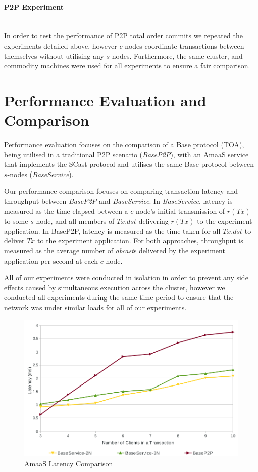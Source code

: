 \paragraph{P2P Experiment} \hspace{0pt} \\
In order to test the performance of P2P total order commits we repeated the  experiments detailed above, however $c$-nodes coordinate transactions between themselves without utilising any $s$-nodes.  Furthermore, the same cluster, and commodity machines were used for all experiments to ensure a fair comparison.   

\section{Performance Evaluation and Comparison}\label{sec:AmaaS_results}
Performance evaluation focuses on the comparison of a \textsf{Base} protocol (TOA), being utilised in a traditional P2P scenario (\emph{BaseP2P}), with an \textsf{AmaaS} service that implements the \textsf{SCast} protocol and utilises the same \textsf{Base} protocol between $s$-nodes (\emph{BaseService}).

Our performance comparison focuses on comparing transaction latency and throughput between \emph{BaseP2P} and \emph{BaseService}.  In \emph{BaseService}, latency is measured as the time elapsed between a $c$-node's initial transmission of $r(Tx)$ to some $s$-node, and all members of $Tx.dst$ delivering $r(Tx)$ to the experiment application. In BaseP2P, latency is measured as the time taken for all $Tx.dst$ to deliver $Tx$ to the experiment application. For both approaches, throughput is measured as the average number of \emph{abcast}s delivered by the experiment application per second at each $c$-node.

All of our experiments were conducted in isolation in order to prevent any side effects caused by simultaneous execution across the cluster, however we conducted all experiments during the same time period to ensure that the network was under similar loads for all of our experiments. 

\begin{figure}[htbp!]
 \includegraphics[width=\textwidth,height=\textheight,keepaspectratio]{Latency}
 \caption{AmaaS Latency Comparison}
 \label{fig:LatencyGraph}
\end{figure}

